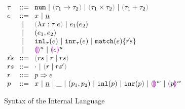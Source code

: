 
\begin{figure}[h]
  $\arraycolsep=4pt\begin{array}{lll}
    \tau & ::= &
      \tnum ~\vert~
      \tarr{\tau_1}{\tau_2} ~\vert~
      \tprod{\tau_1}{\tau_2} ~\vert~
      \tsum{\tau_1}{\tau_2} \\
    e & ::= &
      x ~\vert~
      \hnum{n} \\
      & ~\vert~ &
      \hlam{x}{\tau}{e} ~\vert~
      \hap{e_1}{e_2} \\
      & ~\vert~ &
      \hpair{e_1}{e_2} \\
      & ~\vert~ &
      \hinl{\tau}{e} ~\vert~
      \hinr{\tau}{e} ~\vert~
      \hmatch{e}{\hat{rs}} \\
      & ~\vert~ &
      \hehole{u} ~\vert~
      \hhole{e}{u} \\
    \hat{rs} & ::= &
      \inparens{\zruls{rs}{r}{rs}} \\
    rs & ::= &
      \cdot ~\vert~ \hrulesP{r}{rs'} \\
    r & ::= &
      \hrul{p}{e} \\
    p & ::= &
      x ~\vert~
      \hnum{n} ~\vert~
      \_ ~\vert~
      \hpair{p_1}{p_2} ~\vert~
      \hinlp{p} ~\vert~
      \hinrp{p} ~\vert~
      \hehole{w} ~\vert~
      \hhole{p}{w}
    \end{array}$
\caption{Syntax of the Internal Language}
\label{fig:pat-constraint}
\end{figure}
